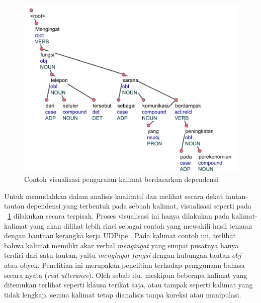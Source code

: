 \begin{figure}
	\centering \includegraphics[width=0.8
	\textwidth] {pics/visualisasi_penguraian.jpg} 
	\caption{Contoh visualisasi penguraian kalimat berdasarkan dependensi} 
\label{fig:visualisasi_penguraian} \end{figure}

Untuk memudahkan dalam analisis kualitatif dan melihat secara dekat tautan-tautan dependensi yang terbentuk pada sebuah kalimat, visualisasi seperti pada \pic~\ref{fig:visualisasi_penguraian} dilakukan secara terpisah. Proses visualisasi ini hanya dilakukan pada kalimat-kalimat yang akan dilihat lebih rinci sebagai contoh yang mewakili hasil temuan dengan bantuan kerangka kerja UDPipe \citep{udpipe2017}. Pada kalimat contoh ini, terlihat bahwa kalimat memiliki akar verbal \textit{mengingat} yang simpai pusatnya hanya terdiri dari satu tautan, yaitu \textit{mengingat fungsi} dengan hubungan tautan $obj$ atau obyek. Penelitian ini merupakan penelitian terhadap penggunaan bahasa secara nyata (\textit{real utterance}). Oleh sebab itu, meskipun beberapa kalimat yang ditemukan terlihat seperti klausa terikat saja, atau tampak seperti kalimat yang tidak lengkap, semua kalimat tetap dianalisis tanpa koreksi atau manipulasi.

